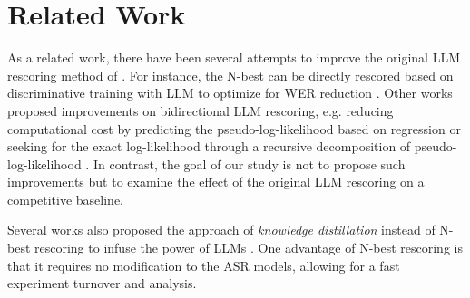 \documentclass[a4paper]{article}
\begin{document}
\section{Related Work}
\label{sec:related_work}


As a related work, there have been several attempts to improve the original LLM rescoring method of \cite{shin2019effective,salazar-etal-2020-masked}. For instance, the N-best can be directly rescored based on discriminative training with LLM to optimize for WER reduction \cite{Chiu2021InnovativeBR,futami2021rescoring,xu2022rescorebert}. Other works proposed improvements on bidirectional LLM rescoring, e.g. reducing computational cost by predicting the pseudo-log-likelihood based on regression \cite{salazar-etal-2020-masked,xu2022rescorebert} or seeking for the exact log-likelihood through a recursive decomposition of pseudo-log-likelihood \cite{Zheng2021AdaptingGG}. In contrast, the goal of our study is not to propose such improvements but to examine the effect of the original LLM rescoring on a competitive baseline.

Several works also proposed the approach of \textit{knowledge distillation} instead of N-best rescoring to infuse the power of LLMs \cite{Futami2020DistillingTK,kubo2022knowledge}. One advantage of N-best rescoring is that it requires no modification to the ASR models, allowing for a fast experiment turnover and analysis.















\end{document}
